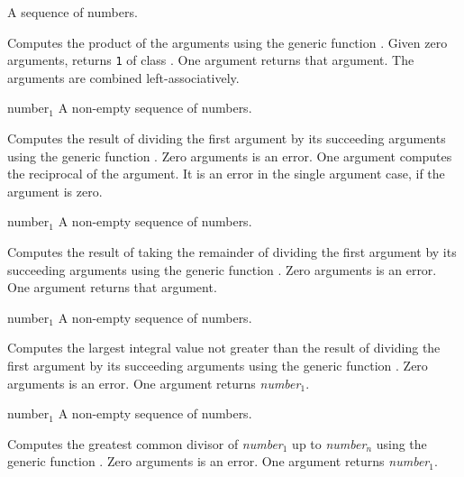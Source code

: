 \begin{optDefinition}
\function{*}
%
\begin{arguments}
    \item[{\optional{number$_1$ number$_2$ ...}}] A sequence of numbers.
\end{arguments}
%
\result%
Computes the product of the arguments using the generic function
.  Given zero arguments, \functionref{*} returns {\tt 1} of
class .  One argument returns that argument.  The arguments
are combined left-associatively.

\function{/}
%
\begin{arguments}
    \item[{number$_1$ \optional{number$_2$ ...}}] A non-empty sequence of
    numbers.
\end{arguments}
%
\result%
Computes the result of dividing the first argument by its succeeding arguments
using the generic function .  Zero arguments is an
error.  One argument computes the reciprocal of the argument.  It is an error in
the single argument case, if the argument is zero.

%
\begin{arguments}
    \item[{number$_1$ \optional{number$_2$ ...}}] A non-empty sequence of
    numbers.
\end{arguments}
%
\result%
Computes the result of taking the remainder of dividing the first argument by
its succeeding arguments using the generic function
.  Zero arguments is an error.
One argument returns that argument.

%
\begin{arguments}
    \item[{number$_1$ \optional{number$_2$ ...}}] A non-empty sequence of
    numbers.
\end{arguments}
%
\result%
Computes the largest integral value not greater than the result of dividing the
first argument by its succeeding arguments using the generic function
.  Zero arguments is an error.  One argument returns {\em
    number$_1$}.

%
\begin{arguments}
    \item[{number$_1$ \optional{number$_2$ ...}}] A non-empty sequence of
    numbers.
\end{arguments}
%
\result%
Computes the greatest common divisor of {\em number$_1$} up to {\em number$_n$}
using the generic function .  Zero arguments is an error.  One
argument returns {\em number$_1$}.


\end{optDefinition}
